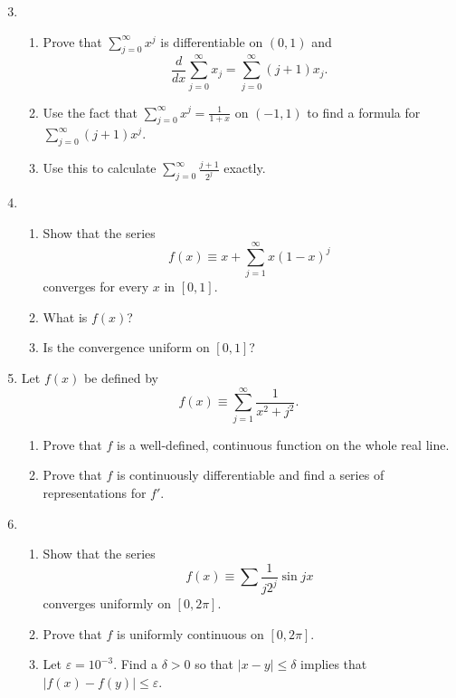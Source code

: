 \documentclass{article}
\begin{document}
\begin{enumerate}
      \setcounter{enumi}{2}
      \item \begin{enumerate}
                  \item Prove that $\sum_{j=0}^\infty x^j$ is differentiable
                        on $(0,1)$ and
                        \[
                              \frac{d}{dx}\sum_{j=0}^\infty x_j= \sum_{j=0}^\infty(j+1)x_j.
                        \]
                  \item Use the fact that $\sum_{j=0}^\infty x^j=\frac{1}{1+x}$ on
                        $(-1,1)$ to find a formula for $\sum_{j=0}^\infty(j+1)x^j$.
                  \item Use this to calculate $\sum_{j=0}^\infty\frac{j+1}{2^j}$ exactly.
            \end{enumerate}
            \setcounter{enumi}{4}
      \item \begin{enumerate}
                  \item Show that the series
                        \[
                              f(x)\equiv x+\sum_{j=1}^\infty x(1-x)^j
                        \]
                        converges for every $x$ in $[0,1]$.
                  \item What is $f(x)$?
                  \item Is the convergence uniform on $[0,1]$?
            \end{enumerate}
            \setcounter{enumi}{6}
      \item Let $f(x)$ be defined by
            \[
                  f(x)\equiv \sum_{j=1}^\infty\frac{1}{x^2+j^2}.
            \]
            \begin{enumerate}
                  \item Prove that $f$ is a well-defined, continuous function
                        on the whole real line.
                  \item Prove that $f$ is continuously differentiable and find a
                        series of representations for $f'$.
            \end{enumerate}
            \setcounter{enumi}{10}
      \item \begin{enumerate}
                  \item Show that the series
                        \[
                              f(x)\equiv \sum \frac{1}{j2^j}\sin jx
                        \]
                        converges uniformly on $[0,2\pi]$.
                  \item Prove that $f$ is uniformly continuous on $[0,2\pi]$.
                  \item Let $\varepsilon=10^{-3}$. Find a $\delta>0$ so that
                        $\lvert x-y\rvert\leq \delta$ implies that
                        $\lvert f(x)-f(y)\rvert\leq \varepsilon$.
            \end{enumerate}
\end{enumerate}
\end{document}
